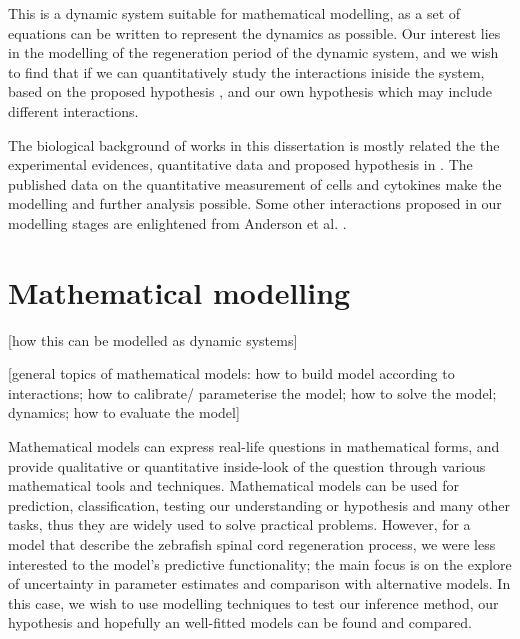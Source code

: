 \documentclass[12pt,a4paper]{report}
\begin{document}
This is a dynamic system suitable for mathematical modelling, as a set of equations can be written to represent the dynamics as possible. Our interest lies in the modelling of the regeneration period of the dynamic system, and we wish to find that if we can quantitatively study the interactions iniside the system, based on the proposed hypothesis \cite{ref:Tsarouchas}, and our own hypothesis which may include different interactions.

The biological background of works in this dissertation is mostly related the the experimental evidences, quantitative data and proposed hypothesis in \cite{ref:Tsarouchas}. The published data on the quantitative measurement of cells and cytokines make the modelling and further analysis possible. Some other interactions proposed in our modelling stages are enlightened from Anderson et al. \cite{Anderson}.

\section{Mathematical modelling}

 [how this can be modelled as dynamic systems]

 [general topics of mathematical models: how to build model according to interactions; how to calibrate/ parameterise the model; how to solve the model; dynamics; how to evaluate the model]

Mathematical models can express real-life questions in mathematical forms, and provide qualitative or quantitative inside-look of the question through various mathematical tools and techniques. Mathematical models can be used for prediction, classification, testing our understanding or hypothesis and many other tasks, thus they are widely used to solve practical problems. However, for a model that describe the zebrafish spinal cord regeneration process, we were less interested to the model's predictive functionality; the main focus is on the explore of uncertainty in parameter estimates and comparison with alternative models. In this case, we wish to use modelling techniques to test our inference method, our hypothesis and hopefully an well-fitted models can be found and compared.
\end{document}
